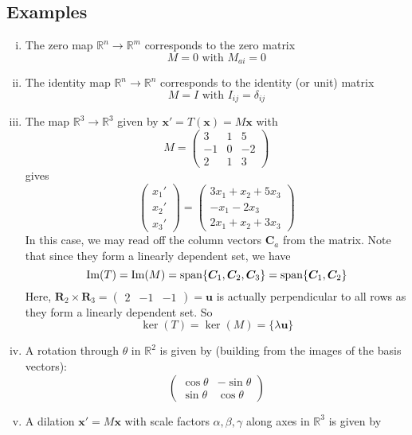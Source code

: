 \documentclass{article}
\begin{document}
\subsection{Examples}
\begin{enumerate}[(i)]
	\item The zero map $\mathbb R^n \to \mathbb R^m$ corresponds to the zero matrix
	      \[ M = 0 \text{ with } M_{ai} = 0 \]
	\item The identity map $\mathbb R^n \to \mathbb R^n$ corresponds to the identity (or unit) matrix
	      \[ M = I \text{ with } I_{ij} = \delta_{ij} \]
	\item The map $\mathbb R^3 \to \mathbb R^3$ given by $\bm x' = T(\bm x) = M\bm x$ with
	      \[ M = \begin{pmatrix}
			      3  & 1 & 5  \\
			      -1 & 0 & -2 \\
			      2  & 1 & 3
		      \end{pmatrix} \]
	      gives
	      \[
		      \begin{pmatrix}
			      x_1' \\ x_2' \\ x_3'
		      \end{pmatrix}
		      =
		      \begin{pmatrix}
			      3x_1 + x_2 + 5x_3 \\
			      -x_1 - 2x_3       \\
			      2x_1 + x_2 + 3x_3
		      \end{pmatrix}
	      \]
	      In this case, we may read off the column vectors $\bm C_a$ from the matrix. Note that since they form a linearly dependent set, we have
	      \[ \Im(T) = \Im(M) = \operatorname{span} \{ \bm C_1, \bm C_2, \bm C_3 \} = \operatorname{span} \{ \bm C_1, \bm C_2 \} \]
	      Here, $\bm R_2 \times \bm R_3 = \begin{pmatrix}
			      2 & -1 & -1
		      \end{pmatrix} = \bm u$ is actually perpendicular to all rows as they form a linearly dependent set. So
	      \[ \ker(T) = \ker(M) = \{ \lambda \bm u \} \]
	\item A rotation through $\theta$ in $\mathbb R^2$ is given by (building from the images of the basis vectors):
	      \[ \begin{pmatrix}
			      \cos \theta & -\sin \theta \\
			      \sin \theta & \cos \theta
		      \end{pmatrix} \]
	\item A dilation $\bm x' = M \bm x$ with scale factors $\alpha, \beta, \gamma$ along axes in $\mathbb R^3$ is given by

\end{enumerate}
\end{document}
